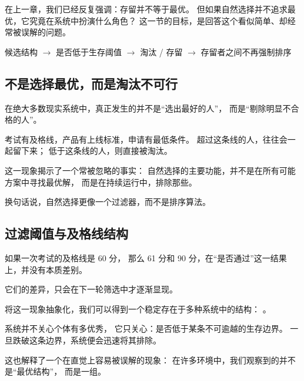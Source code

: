 \documentclass[../main.tex]{subfiles}
\begin{document}
\begin{motivation}
	在上一章，我们已经反复强调：存留并不等于最优。
	但如果自然选择并不追求最优，它究竟在系统中扮演什么角色？
	这一节的目标，是回答这个看似简单、却经常被误解的问题。
\end{motivation}

\begin{logicmap}
	候选结构
	$\rightarrow$ 是否低于生存阈值
	$\rightarrow$ 淘汰 / 存留
	$\rightarrow$ 存留者之间不再强制排序
\end{logicmap}

\subsection{不是选择最优，而是淘汰不可行}

\begin{readingnote}
	在绝大多数现实系统中，真正发生的并不是“选出最好的人”，
	而是“剔除明显不合格的人”。
	
	考试有及格线，产品有上线标准，申请有最低条件。
	超过这条线的人，往往会一起留下来；
	低于这条线的人，则直接被淘汰。
\end{readingnote}

这一现象揭示了一个常被忽略的事实：
自然选择的主要功能，并不是在所有可能方案中寻找最优解，
而是在持续运行中，排除那些。

换句话说，自然选择更像一个过滤器，而不是排序算法。


\subsection{过滤阈值与及格线结构} \label{math:threshold_model}

\begin{readingnote}
	如果一次考试的及格线是 60 分，
	那么 61 分和 90 分，在“是否通过”这一结果上，并没有本质差别。
	
	它们的差异，只会在下一轮筛选中才逐渐显现。
\end{readingnote}

将这一现象抽象化，我们可以得到一个稳定存在于多种系统中的结构：
。

系统并不关心个体有多优秀，
它只关心：是否低于某条不可逾越的生存边界。
一旦跌破这条边界，系统便会迅速将其排除。


这也解释了一个在直觉上容易被误解的现象：
在许多环境中，我们观察到的并不是“最优结构”，
而是一组。
\end{document}
